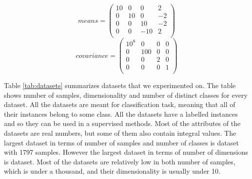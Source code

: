 \documentclass[12pt,a4paper]{report}
\begin{document}
\begin{equation} \label{eq:gauss:means}
means = \begin{pmatrix}
10 & 0 & 0 & 2 \\
0 & 10 & 0 & -2 \\
0 & 0 & 10 & -2 \\
0 & 0 & -10 & 2 \\
\end{pmatrix}
\end{equation}
\begin{equation} \label{eq:gauss:cov}
covariance = \begin{pmatrix}
10^8 & 0 & 0 & 0 \\
0 & 100 & 0 & 0 \\
0 & 0 & 2 & 0 \\
0 & 0 & 0 & 1 \\
\end{pmatrix}
\end{equation}

Table \ref{tab:datasets} summarizes datasets that we experimented on. The table shows number of samples, dimensionality and number of distinct classes for every dataset. All the datasets are meant for classification task, meaning that all of their instances belong to some class. All the datasets have a labelled instances and so they can be used in a supervised methods. Most of the attributes of the datasets are real numbers, but some of them also contain integral values. The largest dataset in terms of number of samples and number of classes is  dataset with 1797 samples. However the largest dataset in terms of number of dimensions is  dataset. Most of the datasets are relatively low in both number of samples, which is under a thousand, and their dimensionality is usually under 10.
\end{document}
